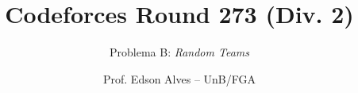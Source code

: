 \title{Codeforces Round 273 (Div. 2)}
\subtitle{Problema B: \it Random Teams}
\author{Prof. Edson Alves -- UnB/FGA}
\date{}
